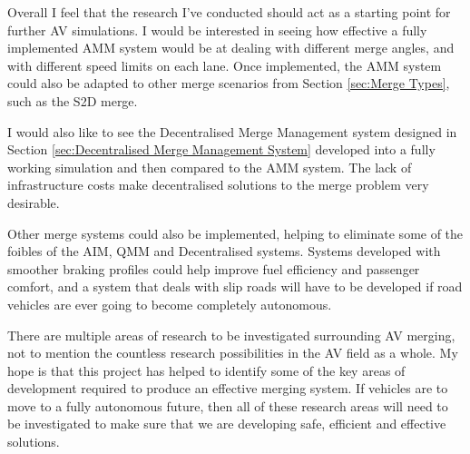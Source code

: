 Overall I feel that the research I've conducted should act as a starting point for further AV simulations. I would be interested in seeing how effective a fully implemented AMM system would be at dealing with different merge angles, and with different speed limits on each lane. Once implemented, the AMM system could also be adapted to other merge scenarios from Section \ref{sec:Merge Types}, such as the S2D merge. 

I would also like to see the Decentralised Merge Management system designed in Section \ref{sec:Decentralised Merge Management System} developed into a fully working simulation and then compared to the AMM system. The lack of infrastructure costs make decentralised solutions to the merge problem very desirable.

Other merge systems could also be implemented, helping to eliminate some of the foibles of the AIM, QMM and Decentralised systems. Systems developed with smoother braking profiles could help improve fuel efficiency and passenger comfort, and a system that deals with slip roads will have to be developed if road vehicles are ever going to become completely autonomous.

There are multiple areas of research to be investigated surrounding AV merging, not to mention the countless research possibilities in the AV field as a whole. My hope is that this project has helped to identify some of the key areas of development required to produce an effective merging system. If vehicles are to move to a fully autonomous future, then all of these research areas will need to be investigated to make sure that we are developing safe, efficient and effective solutions.